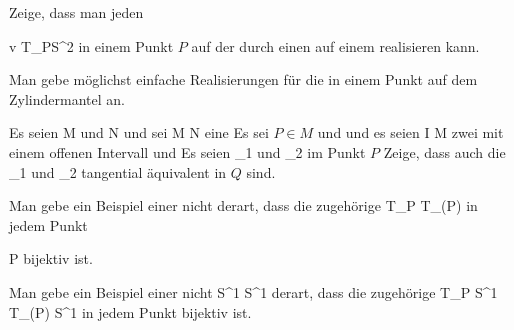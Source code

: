 \setcounter{section}{9}


{}
{

Zeige, dass man jeden

\mavergleichskette
{\vergleichskette
{ v
}
{ \in }{ T_PS^2
}
{  }{
}
{    }{
}
{   }{
}
}
{}{}{}
in einem Punkt $P$ auf der
durch einen 
auf einem
realisieren kann.

}
{} {}

{}
{

Man gebe möglichst einfache Realisierungen für die
in einem Punkt
 auf dem Zylindermantel
 an.

}
{} {}

{}
{

Es seien
\mathkor {} {M} {und} {N} {}
und sei
\maabbdisp {\varphi} { M } { N
} {}
eine
Es sei $P \in M$ und
 und es seien
 { I } { M
} {}
zwei
mit einem offenen Intervall
 und
 Es seien
\mathkor {} {\gamma_1} {und} {\gamma_2} {}
im Punkt $P$
Zeige, dass auch die
\mathkor {} {\varphi \circ \gamma_1} {und} {\varphi \circ \gamma_2} {}
tangential äquivalent in $Q$ sind.

}
{} {}

{}
{

Man gebe ein Beispiel einer
nicht
\maabbdisp {\varphi} {\R} {\R
} {}
derart, dass die zugehörige
 {T_P \R} {T_{\varphi(P)} \R
} {}
in jedem Punkt

\mavergleichskette
{\vergleichskette
{ P
}
{ \in }{ \R
}
{  }{
}
{    }{
}
{   }{
}
}
{}{}{}
bijektiv ist.

}
{} {}

{}
{

Man gebe ein Beispiel einer
nicht
\maabbdisp {\varphi} {S^1} {S^1
} {}
derart, dass die zugehörige
 {T_P S^1} {T_{\varphi(P)} S^1
} {}
in jedem Punkt
 bijektiv ist.

}
{} {}

